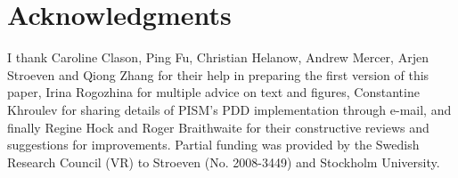\documentclass[review]{igs}
\begin{document}

\section{Acknowledgments}

I thank Caroline Clason, Ping Fu, Christian Helanow, Andrew Mercer, Arjen Stroeven and Qiong Zhang for their help in preparing the first version of this paper, Irina Rogozhina for multiple advice on text and figures, Constantine Khroulev for sharing details of PISM's PDD implementation through e-mail, and finally Regine Hock and Roger Braithwaite for their constructive reviews and suggestions for improvements. Partial funding was provided by the Swedish Research Council (VR) to Stroeven (No. 2008-3449) and Stockholm University.



\end{document}
